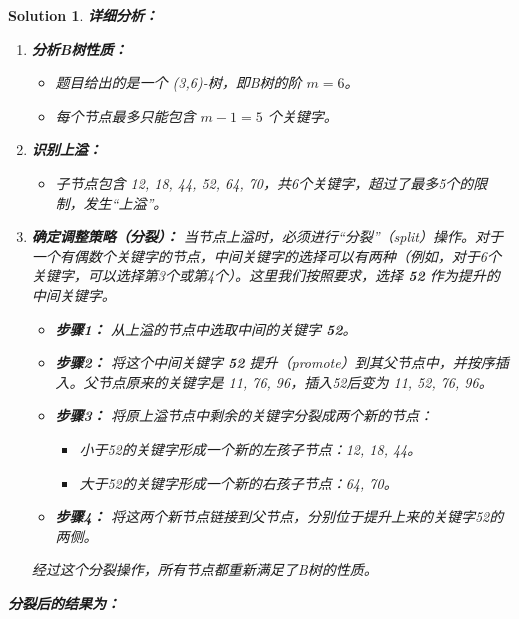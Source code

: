 \documentclass[UTF8]{report}
\newtheorem{solution}{Solution}
\theoremstyle{MyLineTheoremStyle} %
\theoremstyle{MyBlockTheoremStyle} %
\theoremstyle{MySubsubsectionStyle} %
\begin{document}
\begin{solution}
\textbf{详细分析：}

\begin{enumerate}
    \item \textbf{分析B树性质：}
    \begin{itemize}
        \item 题目给出的是一个 (3,6)-树，即B树的阶 $m=6$。
        \item 每个节点最多只能包含 $m-1 = 5$ 个关键字。
    \end{itemize}

    \item \textbf{识别上溢：}
    \begin{itemize}
        \item 子节点包含 {12, 18, 44, 52, 64, 70}，共6个关键字，超过了最多5个的限制，发生“上溢”。
    \end{itemize}

    \item \textbf{确定调整策略（分裂）：}
    当节点上溢时，必须进行“分裂”（split）操作。对于一个有偶数个关键字的节点，中间关键字的选择可以有两种（例如，对于6个关键字，可以选择第3个或第4个）。这里我们按照要求，选择 \textbf{52} 作为提升的中间关键字。
    \begin{itemize}
        \item \textbf{步骤1：} 从上溢的节点中选取中间的关键字 \textbf{52}。
        \item \textbf{步骤2：} 将这个中间关键字 \textbf{52} 提升（promote）到其父节点中，并按序插入。父节点原来的关键字是 {11, 76, 96}，插入52后变为 {11, 52, 76, 96}。
        \item \textbf{步骤3：} 将原上溢节点中剩余的关键字分裂成两个新的节点：
            \begin{itemize}
                \item 小于52的关键字形成一个新的左孩子节点：{12, 18, 44}。
                \item 大于52的关键字形成一个新的右孩子节点：{64, 70}。
            \end{itemize}
        \item \textbf{步骤4：} 将这两个新节点链接到父节点，分别位于提升上来的关键字52的两侧。
    \end{itemize}
    经过这个分裂操作，所有节点都重新满足了B树的性质。

\end{enumerate}

\textbf{分裂后的结果为：}
\begin{center}
\end{center}
\end{solution}
\end{document}
